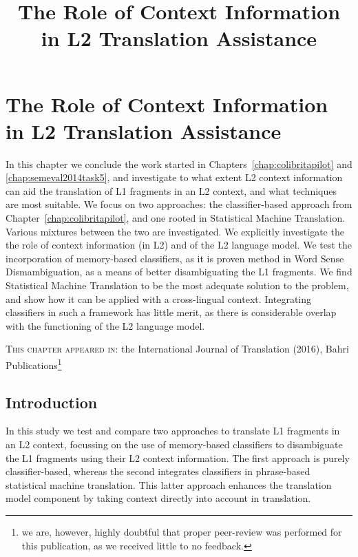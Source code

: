 
\chapter{The Role of Context Information in L2 Translation Assistance}
\title{The Role of Context Information in L2 Translation Assistance}
\label{chap:colibritafinal}



In this chapter we conclude the work started in
Chapters~\ref{chap:colibritapilot} and \ref{chap:semeval2014task5}, and
investigate to what extent L2 context information can aid the translation of L1
fragments in an L2 context, and what techniques are most suitable. We focus on
two approaches: the classifier-based approach from
Chapter~\ref{chap:colibritapilot}, and one rooted in Statistical
Machine Translation.  Various mixtures between the two are investigated. We
explicitly investigate the the role of context information (in L2) and of the
L2 language model. We test the incorporation of memory-based classifiers, as it
is proven method in Word Sense Dismambiguation, as a means of better
disambiguating the L1 fragments.  We find Statistical Machine Translation to be
the most adequate solution to the problem, and show how it can be applied with
a cross-lingual context. Integrating classifiers in such a framework has
little merit, as there is considerable overlap with the functioning of the L2
language model.

\textsc{This chapter appeared in:} the International Journal of Translation (2016), Bahri Publications\footnote{we are,
however, highly doubtful that proper peer-review was performed for this publication, as we received little to no feedback.}


\section{Introduction}

In this study we test and compare two approaches to translate L1 fragments in
an L2 context, focussing on the use of memory-based classifiers to disambiguate
the L1 fragments using their L2 context information. The first approach is
purely classifier-based, whereas the second integrates classifiers in
phrase-based statistical machine translation. This latter approach enhances the
translation model component by taking context directly into account in
translation.


